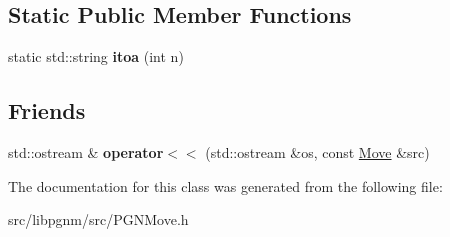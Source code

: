 \subsection*{Static Public Member Functions}
\begin{DoxyCompactItemize}
\item 
\hypertarget{classpgn_1_1Move_ab69fb9cbd8ad8107e6d6264a66cf74af}{
static std::string {\bfseries itoa} (int n)}
\label{classpgn_1_1Move_ab69fb9cbd8ad8107e6d6264a66cf74af}

\end{DoxyCompactItemize}
\subsection*{Friends}
\begin{DoxyCompactItemize}
\item 
\hypertarget{classpgn_1_1Move_a59221be82ec792c0a15addf8746a667c}{
std::ostream \& {\bfseries operator$<$$<$} (std::ostream \&os, const \hyperlink{classpgn_1_1Move}{Move} \&src)}
\label{classpgn_1_1Move_a59221be82ec792c0a15addf8746a667c}

\end{DoxyCompactItemize}


The documentation for this class was generated from the following file:\begin{DoxyCompactItemize}
\item 
src/libpgnm/src/PGNMove.h\end{DoxyCompactItemize}

